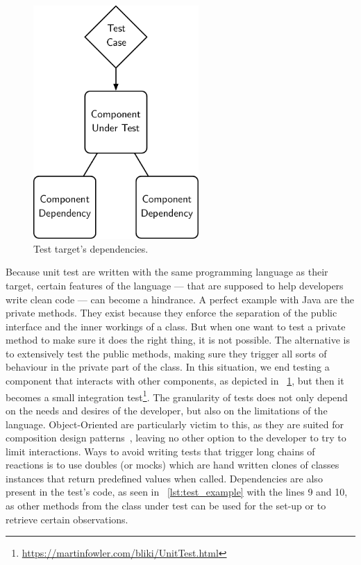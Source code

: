 \documentclass[a4paper,11pt]{sdm_internship}
\theoremstyle{definition}
\begin{document}
\begin{figure}
  \centering
  \includegraphics[width=17em]{component_dependency}
  \caption{Test target's dependencies.}%
  \label{fig:component_dependency}
\end{figure}

Because unit test are written with the same programming language as their target, certain features of the language --- that are supposed to help developers write clean code --- can become a hindrance.
A perfect example with Java are the private methods.
They exist because they enforce the separation of the public interface and the inner workings of a class.
But when one want to test a private method to make sure it does the right thing, it is not possible.
The alternative is to extensively test the public methods, making sure they trigger all sorts of behaviour in the private part of the class.
In this situation, we end testing a component that interacts with other components, as depicted in \figurename~\ref{fig:component_dependency}, but then it becomes a small integration test\footnote{\url{https://martinfowler.com/bliki/UnitTest.html}}.
The granularity of tests does not only depend on the needs and desires of the developer, but also on the limitations of the language.
Object-Oriented are particularly victim to this, as they are suited for composition design patterns~\cite{wolfgang1994design}, leaving no other option to the developer to try to limit interactions.
Ways to avoid writing tests that trigger long chains of reactions is to use doubles (or mocks) which are hand written clones of classes instances that return predefined values when called.
Dependencies are also present in the test's code, as seen in \listingname~\ref{lst:test_example} with the lines 9 and 10, as other methods from the class under test can be used for the set-up or to retrieve certain observations.
\end{document}
